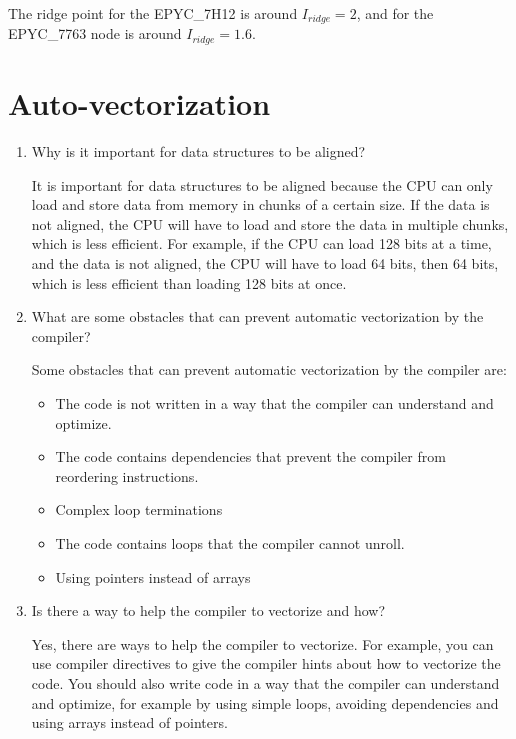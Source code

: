 \documentclass[unicode,11pt,a4paper,oneside,numbers=endperiod,openany]{scrartcl}
\begin{document}
The ridge point for the EPYC\_7H12 is around $I_{ridge}=2$, and for the EPYC\_7763 node is around $I_{ridge}=1.6$.

\section{Auto-vectorization}

\begin{enumerate}
    \item Why is it important for data structures to be aligned?

          It is important for data structures to be aligned because the CPU can only load and store data from memory in chunks of a certain size. If the data is not aligned, the CPU will have to load and store the data in multiple chunks, which is less efficient. For example, if the CPU can load 128 bits at a time, and the data is not aligned, the CPU will have to load 64 bits, then 64 bits, which is less efficient than loading 128 bits at once.

    \item What are some obstacles that can prevent automatic vectorization by the compiler?

          Some obstacles that can prevent automatic vectorization by the compiler are:
          \begin{itemize}
              \item The code is not written in a way that the compiler can understand and optimize.
              \item The code contains dependencies that prevent the compiler from reordering instructions.
              \item Complex loop terminations
              \item The code contains loops that the compiler cannot unroll.
              \item Using pointers instead of arrays
          \end{itemize}

    \item Is there a way to help the compiler to vectorize and how?

          Yes, there are ways to help the compiler to vectorize. For example, you can use compiler directives to give the compiler hints about how to vectorize the code. You should also write code in a way that the compiler can understand and optimize, for example by using simple loops, avoiding dependencies and using arrays instead of pointers.


\end{enumerate}
\end{document}

